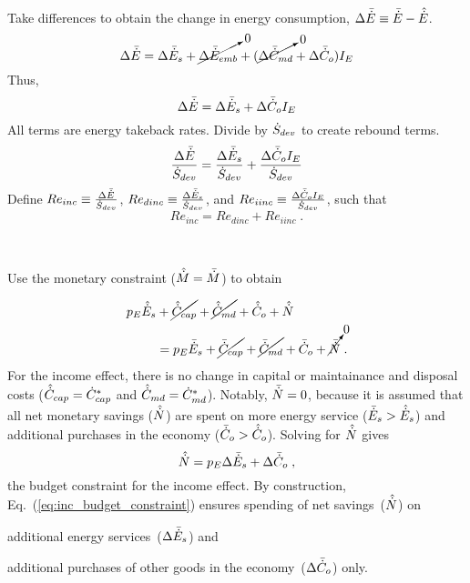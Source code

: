 \begin{landscape}
{Take differences to obtain the change in energy consumption, $\Delta \bar{\dot{E}} \equiv \bar{\dot{E}} - \hat{\dot{E}}$.
%
\begin{equation}
  \Delta \bar{\dot{E}} = \Delta \bar{\dot{E}}_s 
                     + \cancelto{0}{\Delta \bar{\dot{E}}_{emb}}
                     + (\cancelto{0}{\Delta \bar{\dot{C}}_{md}} + \Delta \bar{\dot{C}}_o) I_E
\end{equation}
%
Thus, 
%
\begin{equation}
  \Delta \bar{\dot{E}} = \Delta \bar{\dot{E}}_s + \Delta \bar{\dot{C}}_o I_E
\end{equation}
%
All terms are energy takeback rates.
Divide by $\dot{S}_{dev}$
to create rebound terms.
%
\begin{equation}
  \frac{\Delta \bar{\dot{E}}}{\dot{S}_{dev}} = \frac{\Delta \bar{\dot{E}}_s}{\dot{S}_{dev}} + \frac{\Delta \bar{\dot{C}}_o I_E}{\dot{S}_{dev}}
\end{equation}
%
Define 
$Re_{inc} \equiv \frac{\Delta \bar{\dot{E}}}{\dot{S}_{dev}}$, 
$Re_{dinc} \equiv \frac{\Delta \bar{\dot{E}}_s}{\dot{S}_{dev}}$, and 
$Re_{iinc} \equiv \frac{\Delta \bar{\dot{C}}_o I_E}{\dot{S}_{dev}}$,
such that
%
\begin{equation} \label{eq:Re_inc_def}
  Re_{inc} = Re_{dinc} + Re_{iinc} \; .
\end{equation}
%
}
{
~

Use the monetary constraint ($\hat{\dot{M}} = \bar{\dot{M}}$) to obtain

\begin{align}
  p_E \hat{\dot{E}}_s &+ \cancel{\hat{\dot{C}}_{cap}} + \cancel{\hat{\dot{C}}_{md}} + \hat{\dot{C}}_o + \hat{\dot{N}} \nonumber \\
                  &= p_E \bar{\dot{E}}_s + \cancel{\bar{\dot{C}}_{cap}} + \cancel{\bar{\dot{C}}_{md}} + \bar{\dot{C}}_o + \cancelto{0}{\bar{\dot{N}}} \; .
\end{align}
%
For the income effect, there is no change in capital or maintainance and disposal costs
($\hat{\dot{C}}_{cap} = {\dot{C}}^*_{cap}$ and $\hat{\dot{C}}_{md} = {\dot{C}}^*_{md}$).
Notably, $\bar{\dot{N}} = 0$,
because it is assumed that all net monetary savings ($\hat{\dot{N}}$) are spent on
more energy service ($\bar{\dot{E}}_s > \hat{\dot{E}}_s$)
and
additional purchases in the economy ($\bar{\dot{C}}_o > \hat{\dot{C}}_o$).
Solving for $\hat{\dot{N}}$ gives 
%
\begin{equation} \label{eq:inc_budget_constraint}
  \hat{\dot{N}} = p_E \Delta \bar{\dot{E}}_s + \Delta \bar{\dot{C}}_o \; ,
\end{equation}
%
the budget constraint for the income effect.
By construction, 
Eq.~(\ref{eq:inc_budget_constraint}) ensures
spending of net savings~($\hat{\dot{N}}$) on
%
\begin{enumerate*}[label={(\roman*)}]
	
  \item additional energy services~($\Delta \bar{\dot{E}}_s$) and
  
  \item additional purchases of other goods in the economy~($\Delta \bar{\dot{C}}_o$) only.
    
\end{enumerate*}
}
\end{landscape}
